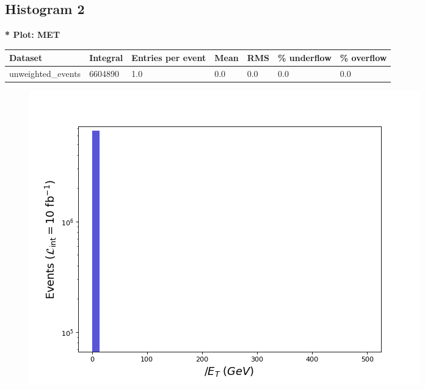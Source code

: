\documentclass[a4paper, 10pt]{article}
\begin{document}
\subsection{ Histogram 2}

\textbf{* Plot: MET}\\
   \begin{table}[H]
  \begin{center}
    \begin{tabular}{|m{23.0mm}|m{23.0mm}|m{18.0mm}|m{19.0mm}|m{19.0mm}|m{19.0mm}|m{19.0mm}|}
      \hline
      {\cellcolor{yellow}         Dataset}& {\cellcolor{yellow}         Integral}& {\cellcolor{yellow}         Entries per event}& {\cellcolor{yellow}         Mean}& {\cellcolor{yellow}         RMS}& {\cellcolor{yellow}         \% underflow}& {\cellcolor{yellow}         \% overflow}\\
      \hline
      {\cellcolor{white}         unweighted\_events}& {\cellcolor{white}         6604890}& {\cellcolor{white}         1.0}& {\cellcolor{white}         0.0}& {\cellcolor{white}         0.0}& {\cellcolor{green}         0.0}& {\cellcolor{green}         0.0}\\
\hline
    \end{tabular}
  \end{center}
\end{table}

\begin{figure}[H]
  \begin{center}
    \includegraphics[scale=0.45]{selection_1.png}\\
\caption{   }
  \end{center}
\end{figure}
      \newpage
\end{document}
